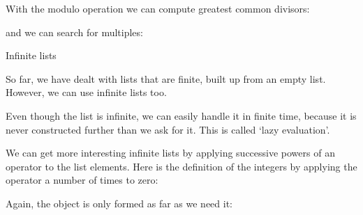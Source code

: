 With the modulo operation we can compute greatest common divisors:
\begin{inputwithcode}
\def\GCD#1#2{%
   \Equal{#1}{#2}%
      {#1}%
      {\GreaterThan{#1}{#2}%
         {\IsOne{#1}\One
            {\GCD{\Sub{#1}{#2}}{#1}}}%
         {\IsOne{#2}\One
            {\GCD{\Sub{#2}{#1}}{#2}}}}}  %
\end{inputwithcode}
\begin{logix}
\end{logix}
and we can search for multiples:
\begin{inputwithcode}
\def\DividesBy#1#2{\IsZero{\Mod{#1}{#2}}}
\def\NotDividesBy#1#2{\GreaterThan\Zero{\Mod{#1}{#2}}}
\def\FirstDividesByStarting#1#2{%
  \DividesBy{#1}{#2}{#2}{\FirstDividesByFrom{#1}{#2}}}
\def\FirstDividesByFrom#1#2{\FirstDividesByStarting{#1}{\AddOne{#2}}}
\end{inputwithcode}
\ndef{}
\begin{logix}
\end{logix}

 {Infinite lists}

So far, we have dealt with lists that are finite, built up from an
empty list. However, we can use infinite lists too.
\begin{inputwithcode}
\def\Stream#1{\Cons{#1}{\Stream{#1}}}
\end{inputwithcode}
\begin{logix}
\end{logix}
Even though the list is infinite, we can easily handle it in finite
time, because it is never constructed further than we ask for it. This
is called `lazy evaluation'.

We can get more interesting infinite lists by applying successive
powers of an operator to the list elements. Here is the definition of
the integers by applying the  operator a number of times to zero:
\begin{inputwithcode}
\def\StreamOp#1#2{\Cons{#2}{\StreamOp{#1}{#1{#2}}}}
\def\Integers{\StreamOp\AddOne\Zero}
\def\PositiveIntegers{\Tail\Integers}
\def\TwoOrMore{\Tail\PositiveIntegers}
\end{inputwithcode}
Again, the  object is only formed as far as we need it:
\begin{logix}
%
  {\Head{\Tail{\Tail{\Tail{\Tail{\Tail{\Integers}}}}}}}
\end{logix}

